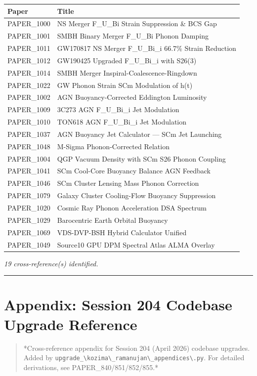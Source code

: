 \documentclass[12pt,a4paper]{article}
\begin{document}
\begin{table}[H]
\centering
\small
\begin{tabularx}{\linewidth}{@{}>{\raggedright\arraybackslash}X>{\raggedright\arraybackslash}X@{}}
\toprule
Paper & Title \tabularnewline
\midrule
PAPER\_1000 & NS Merger F\_{U\_Bi} Strain Suppression \& BCS Gap \tabularnewline
PAPER\_1001 & SMBH Binary Merger F\_{U\_Bi} Phonon Damping \tabularnewline
PAPER\_1011 & GW170817 NS Merger F\_{U\_Bi\_i} 66.7\% Strain Reduction \tabularnewline
PAPER\_1012 & GW190425 Upgraded F\_{U\_Bi\_i} with S26(3) \tabularnewline
PAPER\_1014 & SMBH Merger Inspiral-Coalescence-Ringdown \tabularnewline
PAPER\_1022 & GW Phonon Strain SCm Modulation of h(t) \tabularnewline
PAPER\_1002 & AGN Buoyancy-Corrected Eddington Luminosity \tabularnewline
PAPER\_1009 & 3C273 AGN F\_{U\_Bi\_i} Jet Modulation \tabularnewline
PAPER\_1010 & TON618 AGN F\_{U\_Bi\_i} Jet Modulation \tabularnewline
PAPER\_1037 & AGN Buoyancy Jet Calculator --- SCm Jet Launching \tabularnewline
PAPER\_1048 & M-Sigma Phonon-Corrected Relation \tabularnewline
PAPER\_1004 & QGP Vacuum Density with SCm S26 Phonon Coupling \tabularnewline
PAPER\_1041 & SCm Cool-Core Buoyancy Balance AGN Feedback \tabularnewline
PAPER\_1046 & SCm Cluster Lensing Mass Phonon Correction \tabularnewline
PAPER\_1079 & Galaxy Cluster Cooling-Flow Buoyancy Suppression \tabularnewline
PAPER\_1020 & Cosmic Ray Phonon Acceleration DSA Spectrum \tabularnewline
PAPER\_1029 & Barocentric Earth Orbital Buoyancy \tabularnewline
PAPER\_1069 & VDS-DVP-BSH Hybrid Calculator Unified \tabularnewline
PAPER\_1049 & Source10 GPU DPM Spectral Atlas ALMA Overlay \tabularnewline
\bottomrule
\end{tabularx}
\end{table}

\emph{19 cross-reference(s) identified.}

\medskip\hrule\medskip

\section{Appendix: Session 204 Codebase Upgrade Reference}

\begin{quote}
*Cross-reference appendix for Session 204 (April 2026) codebase upgrades.
Added by \texttt{upgrade\_\textbackslash {kozima\textbackslash \_ramanujan\textbackslash \_appendices\textbackslash }.py}. For detailed derivations,
see PAPER\_840/851/852/855.*
\end{quote}
\end{document}
